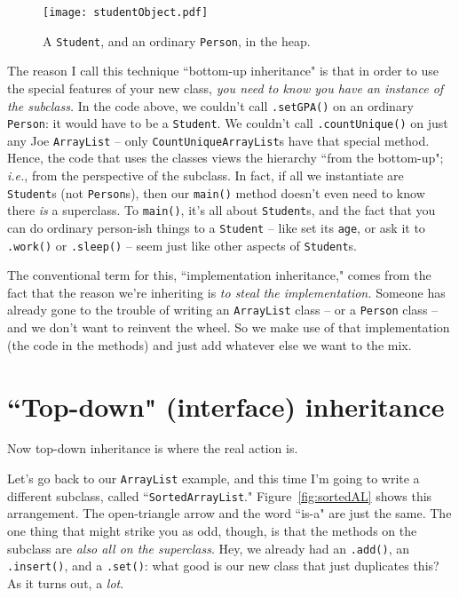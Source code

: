 \begin{figure}
\centering
\texttt{[image: studentObject.pdf]}
\caption{A \texttt{Student}, and an ordinary \texttt{Person}, in the heap.}
\label{fig:studentObject}
\end{figure}

The reason I call this technique ``bottom-up inheritance" is that in order to
use the special features of your new class, \textit{you need to know you have
an instance of the subclass.} In the code above, we couldn't call
\texttt{.setGPA()} on an ordinary \texttt{Person}: it would have to be a
\texttt{Student}. We couldn't call \texttt{.countUnique()} on just any Joe
\texttt{ArrayList} -- only \texttt{CountUniqueArrayList}s have that special
method. Hence, the code that uses the classes views the hierarchy ``from the
bottom-up"; \textit{i.e.}, from the perspective of the subclass. In fact, if
all we instantiate are \texttt{Student}s (not \texttt{Person}s), then our
\texttt{main()} method doesn't even need to know there \textit{is} a
superclass. To \texttt{main()}, it's all about \texttt{Student}s, and the fact
that you can do ordinary person-ish things to a \texttt{Student} -- like set
its \texttt{age}, or ask it to \texttt{.work()} or \texttt{.sleep()} -- seem
just like other aspects of \texttt{Student}s.

The conventional term for this, ``implementation inheritance," comes from the
fact that the reason we're inheriting is \textit{to steal the implementation.}
Someone has already gone to the trouble of writing an \texttt{ArrayList} class
-- or a \texttt{Person} class -- and we don't want to reinvent the wheel. So
we make use of that implementation (the code in the methods) and just add
whatever else we want to the mix.

\section{``Top-down" (interface) inheritance}

Now top-down inheritance is where the real action is.

Let's go back to our \texttt{ArrayList} example, and this time I'm going to
write a different subclass, called ``\texttt{SortedArrayList}."
Figure~\ref{fig:sortedAL} shows this arrangement. The open-triangle arrow and
the word ``is-a" are just the same. The one thing that might strike you as
odd, though, is that the methods on the subclass are \textit{also all on the
superclass}. Hey, we already had an \texttt{.add()}, an \texttt{.insert()},
and a \texttt{.set()}: what good is our new class that just duplicates this?
As it turns out, a \textit{lot}.

